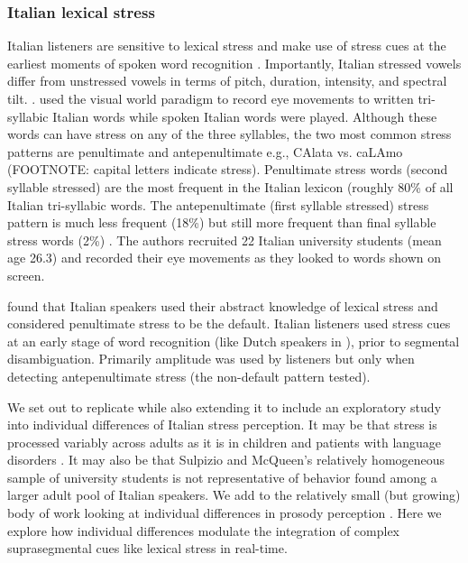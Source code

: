 \subsubsection{Italian lexical stress}
Italian listeners are sensitive to lexical stress and make use of stress cues at the earliest moments of spoken word recognition \cite{Tagliapietra2005, Sulpizio_McQueen_2012}. Importantly, Italian stressed vowels differ from unstressed vowels in terms of pitch, duration, intensity, and spectral tilt. \citep{Maturi1998}. \cite{Sulpizio_McQueen_2012} used the visual world paradigm to record eye movements to written tri-syllabic Italian words while spoken Italian words were played. Although these words can have stress on any of the three syllables, the two most common stress patterns are penultimate and antepenultimate e.g., CAlata vs. caLAmo (FOOTNOTE: capital letters indicate stress). Penultimate stress words (second syllable stressed) are the most frequent in the Italian lexicon (roughly 80\% of all Italian tri-syllabic words. The antepenultimate (first syllable stressed) stress pattern is much less frequent (18\%) but still more frequent than final syllable stress words (2\%) \citep{thornton_1997}. The authors recruited 22 Italian university students (mean age 26.3) and recorded their eye movements as they looked to words shown on screen.

\cite{Sulpizio_McQueen_2012} found that Italian speakers used their abstract knowledge of lexical stress and considered penultimate stress to be the default. Italian listeners used stress cues at an early stage of word recognition (like Dutch speakers in \cite{Reinisch2010}), prior to segmental disambiguation. Primarily amplitude was used by listeners but only when detecting antepenultimate stress (the non-default pattern tested). 

We set out to replicate \cite{Sulpizio_McQueen_2012}  while also extending it to include an exploratory study into individual differences of Italian stress perception. It may be that stress is processed variably across adults as it is in children \citep[e.g.,][]{Colombo2014} and patients with language disorders \citep[e.g.,][]{Cappa1997}. It may also be that Sulpizio and McQueen's relatively homogeneous sample of university students is not representative of behavior found among a larger adult pool of Italian speakers. We add to the relatively small (but growing) body of work looking at individual differences in prosody perception \citep[e.g.,][]{Roy2017,Bishop2017,Lameris2023}. Here we explore how individual differences modulate the integration of complex suprasegmental cues like lexical stress in real-time.


